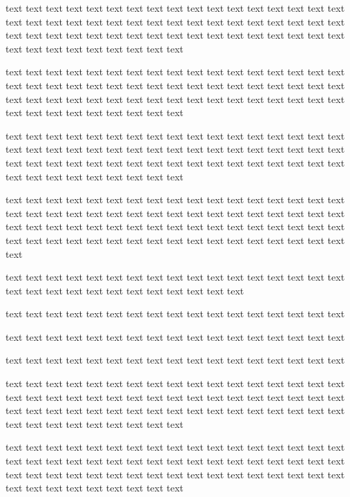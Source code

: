 \documentclass[twocolumn]{article}
\begin{document}
    text text text text text text text text text text text text text text text text text text text text text text text text text text text text text text text text text text text text text text text text text text text text text text text text text text text text text text text text text text text text

    text text text text text text text text text text text text text text text text text text text text text text text text text text text text text text text text text text text text text text text text text text text text text text text text text text text text text text text text text text text text

    text text text text text text text text text text text text text text text text text text text text text text text text text text text text text text text text text text text text text text text text text text text text text text text text text text text text text text text text text text text text

    text text text text text text text text text text text text text text text text text text text text text text text text text text text text text text text text text text text text text text text text text text text text text text text text text text text text text text text text text text text text text text text text text text text text text

    text text text text text text text text text text text text text text text text text text text text text text text text text text text text text

    text text text text text text text text text text text text text text text text text

    text text text text text text text text text text text text text text text text text

    text text text text text text text text text text text text text text text text text

text text text text text text text text text text text text text text text text text text text text text text text text text text text text text text text text text text text text text text text text text text text text text text text text text text text text text text text text text text text text

    text text text text text text text text text text text text text text text text text text text text text text text text text text text text text text text text text text text text text text text text text text text text text text text text text text text text text text text text text text text text
\end{document}
